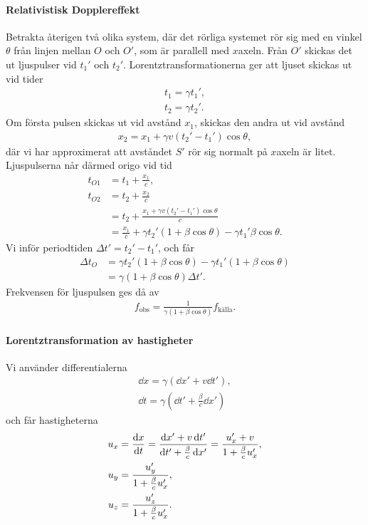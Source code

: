 \paragraph{Relativistisk Dopplereffekt}
Betrakta återigen två olika system, där det rörliga systemet rör sig med en vinkel $\theta$ från linjen mellan $O$ och $O'$, som är parallell med $x$axeln. Från $O'$ skickas det ut ljuspulser vid $t_{1}'$ och $t_{2}'$. Lorentztransformationerna ger att ljuset skickas ut vid tider
\begin{align*}
	t_{1} = \gamma t_{1}', \\
	t_{2} = \gamma t_{2}'.
\end{align*}
Om första pulsen skickas ut vid avstånd $x_{1}$, skickas den andra ut vid avstånd
\begin{align*}
	x_{2} = x_{1} + \gamma v(t_{2}' - t_{1}')\cos{\theta},
\end{align*}
där vi har approximerat att avståndet $S'$ rör sig normalt på $x$axeln är litet. Ljuspulserna når därmed origo vid tid
\begin{align*}
	t_{O1} &= t_{1} + \frac{x_{1}}{c}, \\
	t_{O2} &= t_{2} + \frac{x_{2}}{c} \\
	       &= t_{2} + \frac{x_{1} + \gamma v(t_{2}' - t_{1}')\cos{\theta}}{c} \\
	       &= \frac{x_{1}}{c} + \gamma t_{2}'(1 + \beta\cos{\theta}) - \gamma t_{1}'\beta\cos{\theta}.
\end{align*}
Vi inför periodtiden $\Delta t' = t_{2}' - t_{1}'$, och får
\begin{align*}
	\Delta t_{O} &= \gamma t_{2}'(1 + \beta\cos{\theta}) - \gamma t_{1}'(1 + \beta\cos{\theta}) \\
	             &= \gamma (1 + \beta\cos{\theta})\Delta t'.
\end{align*}
Frekvensen för ljuspulsen ges då av
\begin{align*}
	f_{\text{obs}} = \frac{1}{\gamma(1 + \beta\cos{\theta})}f_{\text{källa}}.
\end{align*}

\paragraph{Lorentztransformation av hastigheter}
Vi använder differentialerna
\begin{align*}
	\dd{x} = \gamma(\dd{x'} + v\dd{t'}), \\
	\dd{t} = \gamma(\dd{t'} + \frac{\beta}{c}\dd{x'})
\end{align*}
och får hastigheterna
\begin{align*}
	u_{x} &= \dv{x}{t} = \frac{\dd{x'} + v\dd{t'}}{\dd{t'} + \frac{\beta}{c}\dd{x'}} = \frac{u_{x}' + v}{1 + \frac{\beta}{c}u_{x}'}, \\
	u_{y} &= \frac{u_{y}'}{1 + \frac{\beta}{c}u_{x}'}, \\
	u_{z} &= \frac{u_{z}'}{1 + \frac{\beta}{c}u_{x}'}.
\end{align*}

